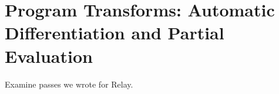 \chapter{Program Transforms: Automatic Differentiation and Partial Evaluation}
\label{ch:ad}

Examine passes we wrote for Relay.
